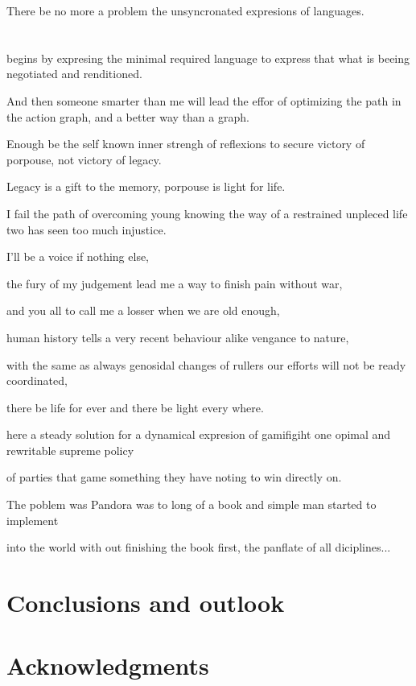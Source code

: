 \documentclass[a4paper,fleqn]{cas-sc}
\begin{document}
There be no more a problem the unsyncronated expresions of languages. 


\section{}
begins by expresing the minimal required language to express that what is beeing negotiated and renditioned. 

And then someone smarter than me will lead the effor of optimizing the path in the action graph, and a better 
way than a graph. 

Enough be the self known inner strengh of reflexions to secure victory of porpouse, not victory of legacy. 

Legacy is a gift to the memory, porpouse is light for life. 

I fail the path of overcoming young knowing the way of a restrained unpleced life two has seen too much injustice. 

I'll be a voice if nothing else, 

the fury of my judgement lead me a way to finish pain without war, 

and you all to call me a losser when we are old enough, 

human history tells a very recent behaviour alike vengance to nature, 

with the same as always genosidal changes of rullers our efforts will not be ready coordinated, 

there be life for ever and there be light every where. 

here a steady solution for a dynamical expresion of gamifigiht one opimal and rewritable supreme policy 

of parties that game something they have noting to win directly on. 

The poblem was Pandora was to long of a book and simple man started to implement 

into the world with out finishing the book first, the panflate of all diciplines...
\section{}
\section{}

\section{Conclusions and outlook}

\section{Acknowledgments}



\end{document}
